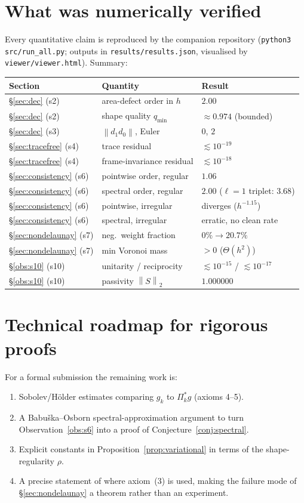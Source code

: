 \documentclass[11pt]{article}
\theoremstyle{plain}
\theoremstyle{definition}
\theoremstyle{remark}
\newcommand{\norm}[1]{\left\lVert #1 \right\rVert}
\begin{document}
\appendix
\section{What was numerically verified}
\label{app:verified}
Every quantitative claim is reproduced by the companion repository
(\texttt{python3 src/run\_all.py}; outputs in \texttt{results/results.json},
visualised by \texttt{viewer/viewer.html}). Summary:

\begin{center}
\small
\begin{tabular}{@{}lll@{}}
\toprule
Section & Quantity & Result \\
\midrule
\S\ref{sec:dec} (s2) & area-defect order in $h$ & $2.00$ \\
\S\ref{sec:dec} (s2) & shape quality $q_{\min}$ & $\approx 0.974$ (bounded) \\
\S\ref{sec:dec} (s3) & $\norm{d_1 d_0}$, Euler & $0$, \; $2$ \\
\S\ref{sec:tracefree} (s4) & trace residual & $\lesssim 10^{-19}$ \\
\S\ref{sec:tracefree} (s4) & frame-invariance residual & $\lesssim 10^{-18}$ \\
\S\ref{sec:consistency} (s6) & pointwise order, regular & $1.06$ \\
\S\ref{sec:consistency} (s6) & spectral order, regular & $2.00$ ($\ell=1$ triplet: $3.68$) \\
\S\ref{sec:consistency} (s6) & pointwise, irregular & diverges ($h^{-1.15}$) \\
\S\ref{sec:consistency} (s6) & spectral, irregular & erratic, no clean rate \\
\S\ref{sec:nondelaunay} (s7) & neg.\ weight fraction & $0\%\to 20.7\%$ \\
\S\ref{sec:nondelaunay} (s7) & min Voronoi mass & $>0$ ($\Theta(h^2)$) \\
\S\ref{obs:s10} (s10) & unitarity / reciprocity & $\lesssim10^{-15}$ / $\lesssim10^{-17}$ \\
\S\ref{obs:s10} (s10) & passivity $\norm{S}_2$ & $1.000000$ \\
\bottomrule
\end{tabular}
\end{center}

\section{Technical roadmap for rigorous proofs}
For a formal submission the remaining work is:
\begin{enumerate}
  \item Sobolev/Hölder estimates comparing $g_k$ to $\Pi_k^* g$ (axioms 4--5).
  \item A Babuška--Osborn spectral-approximation argument to turn
    Observation~\ref{obs:s6} into a proof of Conjecture~\ref{conj:spectral}.
  \item Explicit constants in Proposition~\ref{prop:variational} in terms of the
    shape-regularity $\rho$.
  \item A precise statement of where axiom~(3) is used, making the failure mode
    of \S\ref{sec:nondelaunay} a theorem rather than an experiment.
\end{enumerate}
\end{document}
